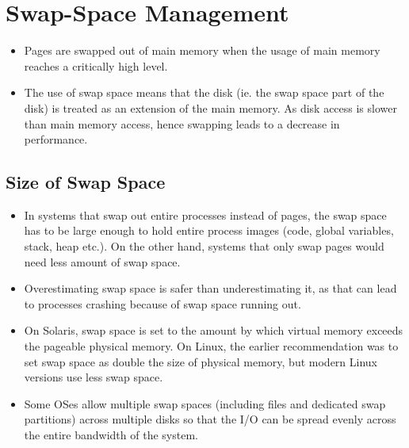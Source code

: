 \documentclass{article}
\theoremstyle{plain}
\theoremstyle{definition}
\begin{document}
\section{Swap-Space Management}
\begin{itemize}
    \item Pages are swapped out of main memory when the usage of main memory reaches a critically high level. 
    
    \item The use of swap space means that the disk (ie. the swap space part of the disk) is treated as an extension of the main memory. As disk access is slower than main memory access, hence swapping leads to a decrease in performance. 
\end{itemize}

\subsection{Size of Swap Space}
\begin{itemize}
    \item In systems that swap out entire processes instead of pages, the swap space has to be large enough to hold entire process images (code, global variables, stack, heap etc.). On the other hand, systems that only swap pages would need less amount of swap space.  
    
    \item Overestimating swap space is safer than underestimating it, as that can lead to processes crashing because of swap space running out. 
    
    \item On Solaris, swap space is set to the amount by which virtual memory exceeds the pageable physical memory. On Linux, the earlier recommendation was to set swap space as double the size of physical memory, but modern Linux versions use less swap space. 
    
    \item Some OSes allow multiple swap spaces (including files and dedicated swap partitions) across multiple disks so that the I/O can be spread evenly across the entire bandwidth of the system. 
\end{itemize}
\end{document}
